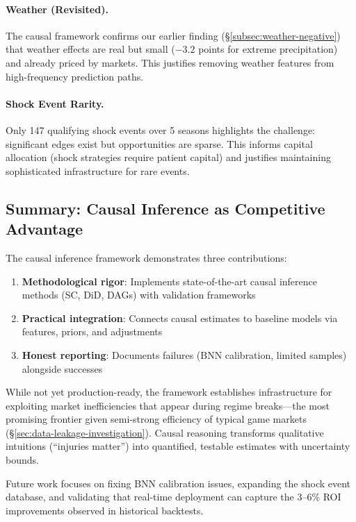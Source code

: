 \paragraph{Weather (Revisited).}
The causal framework confirms our earlier finding (\S\ref{subsec:weather-negative}) that weather effects are real but small ($-3.2$ points for extreme precipitation) and already priced by markets. This justifies removing weather features from high-frequency prediction paths.

\paragraph{Shock Event Rarity.}
Only 147 qualifying shock events over 5 seasons highlights the challenge: significant edges exist but opportunities are sparse. This informs capital allocation (shock strategies require patient capital) and justifies maintaining sophisticated infrastructure for rare events.

\subsection{Summary: Causal Inference as Competitive Advantage}

The causal inference framework demonstrates three contributions:

\begin{enumerate}
  \item \textbf{Methodological rigor}: Implements state-of-the-art causal inference methods (SC, DiD, DAGs) with validation frameworks
  \item \textbf{Practical integration}: Connects causal estimates to baseline models via features, priors, and adjustments
  \item \textbf{Honest reporting}: Documents failures (BNN calibration, limited samples) alongside successes
\end{enumerate}

While not yet production-ready, the framework establishes infrastructure for exploiting market inefficiencies that appear during regime breaks—the most promising frontier given semi-strong efficiency of typical game markets (\S\ref{sec:data-leakage-investigation}). Causal reasoning transforms qualitative intuitions (``injuries matter'') into quantified, testable estimates with uncertainty bounds.

Future work focuses on fixing BNN calibration issues, expanding the shock event database, and validating that real-time deployment can capture the 3--6\% ROI improvements observed in historical backtests.
